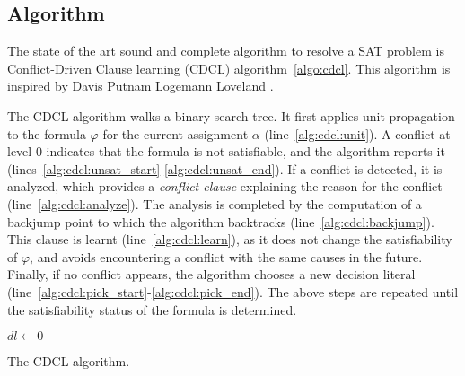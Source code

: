 \subsection{Algorithm}

The state of the art sound and complete algorithm to resolve a SAT problem is 
Conflict-Driven Clause learning (CDCL) algorithm~\ref{algo:cdcl}.
This algorithm is inspired by Davis Putnam Logemann Loveland \cite{dpll_62}.


The CDCL algorithm walks a binary search tree.  It first applies unit propagation to
the formula $\varphi$ for the current assignment $\alpha$ (line~\ref{alg:cdcl:unit}).
A conflict at level $0$ indicates that the formula is not satisfiable, and the algorithm
reports it (lines~\ref{alg:cdcl:unsat_start}-\ref{alg:cdcl:unsat_end}).
If a conflict is detected, it is analyzed, which provides a \emph{conflict clause} 
explaining the reason for the conflict (line~\ref{alg:cdcl:analyze}).
The analysis is completed by the computation of a
backjump point to which the algorithm backtracks (line~\ref{alg:cdcl:backjump}).
  This clause is learnt (line~\ref{alg:cdcl:learn}), as it does not change the
satisfiability of $\varphi$, and avoids encountering a conflict with the same
causes in the future.
Finally, if no conflict appears, the algorithm chooses a new decision literal 
(line~\ref{alg:cdcl:pick_start}-\ref{alg:cdcl:pick_end}).
The above steps are repeated until the satisfiability status of the formula is determined.


\begin{algorithm}
	{
		$dl \gets 0$ 
		\Return \true
	}
	\caption{The CDCL algorithm.}
	\label{algo:cdcl}
	
\end{algorithm}



